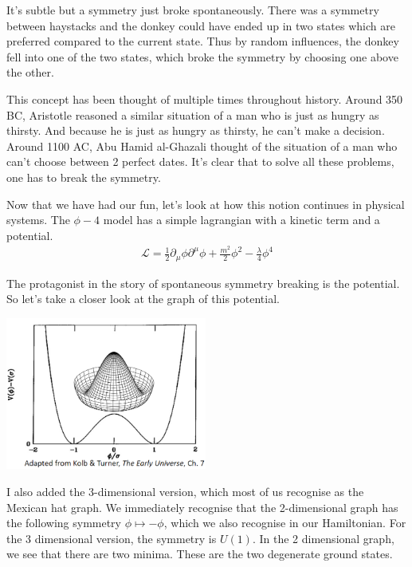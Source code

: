 \documentclass{article}
\numberwithin{equation}{section}
\begin{document}
It's subtle but a symmetry just broke spontaneously.
There was a symmetry between haystacks and the donkey could have ended up in two states which are preferred compared to the current state.
Thus by random influences, the donkey fell into one of the two states, which broke the symmetry by choosing one above the other.

This concept has been thought of multiple times throughout history.
Around 350 BC, Aristotle reasoned a similar situation of a man who is just as hungry as thirsty. 
And because he is just as hungry as thirsty, he can't make a decision.
Around 1100 AC, Abu Hamid al-Ghazali thought of the situation of a man who can't choose between 2 perfect dates.
It's clear that to solve all these problems, one has to break the symmetry.

Now that we have had our fun, let's look at how this notion continues in physical systems.
The $\phi-4$ model has a simple lagrangian with a kinetic term and a potential.
\begin{align}
    \mathcal{L}=\frac{1}{2}\partial_\mu\phi\partial^\mu\phi +\frac{m^2}{2}\phi^2-\frac{\lambda}{4}\phi^4
    \label{eq:phi-4-Lagrangian}
\end{align}

The protagonist in the story of spontaneous symmetry breaking is the potential.
So let's take a closer look at the graph of this potential.

\begin{center}
\includegraphics[width=250px]{Knipsel.PNG}    
\end{center}

I also added the 3-dimensional version, which most of us recognise as the Mexican hat graph.
We immediately recognise that the 2-dimensional graph has the following symmetry $\phi\mapsto -\phi$, which we also recognise in our Hamiltonian.
For the 3 dimensional version, the symmetry is $U(1)$.
In the 2 dimensional graph, we see that there are two minima. 
These are the two degenerate ground states.
\end{document}
